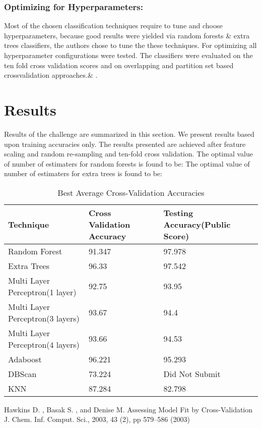 \documentclass{llncs}
\begin{document}
\subsubsection{Optimizing for Hyperparameters:} Most  of the chosen classification techniques require to tune and choose hyperparameters, because good results were yielded via random forests \& extra trees classifiers, the authors chose to tune the these techniques. For optimizing all hyperparameter configurations were tested. The classifiers were evaluated on the ten fold cross validation scores and on overlapping and partition set based crossvalidation approaches.\& .  

\section{Results}
Results of the challenge are summarized in this section. We present results based upon training accuracies only. The results presented are achieved after feature scaling and random re-sampling and ten-fold cross validation. 
The optimal value of number of estimaters for random forests is found to be:
The optimal value of number of estimaters for extra trees is found to be:

\begin{table}
	\centering
	\caption{Best Average Cross-Validation Accuracies}
	\begin{tabular}{ |p{3cm}||p{3cm}||p{3cm}|}
		\hline
		Technique                  &Cross Validation Accuracy & Testing Accuracy(Public Score)\\
		\hline
		Random Forest              								&91.347 &97.978\\
		Extra Trees													&96.33 &97.542\\
		Multi Layer Perceptron(1 layer)	 			  		&92.75 &93.95\\
		Multi Layer Perceptron(3 layers)	 			  &93.67 &94.4\\
		Multi Layer Perceptron(4 layers)	 			  &93.66 &94.53\\
		Adaboost	 					            &96.221 &95.293\\
		DBScan	 						             &73.224 &Did Not Submit\\
		KNN              				               &87.284 &82.798\\

		 \hline
	\end{tabular}
	\label{table}
\end{table}


%
%
\begin{thebibliography}{5}
%

Hawkins D. , Basak S. , and Denise M. 
Assessing Model Fit by Cross-Validation
J. Chem. Inf. Comput. Sci., 2003, 43 (2), pp 579–586 (2003)

\end{thebibliography}
\end{document}
